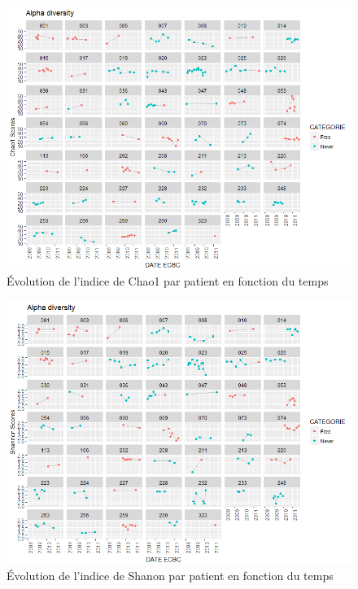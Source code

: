\documentclass[12pt,a4paper]{article}
\begin{document}
{\begin{figure}[h]
\begin{center}
\includegraphics[scale=0.8]{img/alpha_chao1.png}\hfill
\end{center}
\caption{Évolution de l'indice de Chao1 par patient en fonction du temps}
\label{alphaChao1}
\end{figure}

\begin{figure}[h]
\begin{center}
\includegraphics[scale=0.8]{img/alpha_shannon.png}\hfill
\end{center}
\caption{Évolution de l'indice de Shanon par patient en fonction du temps}
\label{alphaShannon}
\end{figure}


}
\end{document}
